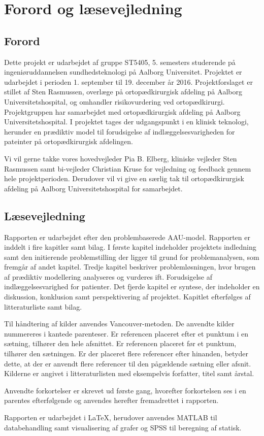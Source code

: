 \chapter*{Forord og læsevejledning}

\section*{Forord}
Dette projekt er udarbejdet af gruppe ST5405, 5. semesters studerende på ingeniøruddannelsen sundhedsteknologi på Aalborg Universitet. Projektet er udarbejdet i perioden 1. september til 19. december år 2016. Projektforslaget er stillet af Sten Rasmussen, overlæge på ortopædkirurgisk afdeling på Aalborg Universitetshospital, og omhandler risikovurdering ved ortopædkirurgi. Projektgruppen har samarbejdet med ortopædkirurgisk afdeling på Aalborg Universitetshospital. I projektet tages der udgangspunkt i en klinisk teknologi, herunder en prædiktiv model til forudsigelse af indlæggelsesvarigheden for pateinter på ortopædkirurgisk afdelingen. 


Vi vil gerne takke vores hovedvejleder Pia B. Elberg, kliniske vejleder Sten Rasmussen samt bi-vejleder Christian Kruse for vejledning og feedback gennem hele projektperioden. Derudover vil vi give en særlig tak til ortopædkirurgisk afdeling på Aalborg Universitetshospital for samarbejdet. 


\section*{Læsevejledning}
Rapporten er udarbejdet efter den problembaserede AAU-model. Rapporten er inddelt i fire kapitler samt bilag. I første kapitel indeholder projektets indledning samt den initierende problemstilling der ligger til grund for problemanalysen, som fremgår af andet kapitel. Tredje kapitel beskriver problemløsningen, hvor brugen af prædiktiv modellering analyseres og vurderes ift. Forudsigelse af indlæggelsesvarighed for patienter. Det fjerde kapitel er syntese, der indeholder en diskussion, konklusion samt perspektivering af projektet. Kapitlet efterfølges af litteraturliste samt bilag. 


Til håndtering af kilder anvendes Vancouver-metoden. De anvendte kilder nummereres i kantede parenteser. Er referencen placeret efter et punktum i en sætning, tilhører den hele afsnittet. Er referencen placeret før et punktum, tilhører den sætningen. Er der placeret flere referencer efter hinanden, betyder dette, at der er anvendt flere referencer til den pågældende sætning eller afsnit. Kilderne er angivet i litteraturlisten med eksempelvis forfatter, titel samt årstal. 


Anvendte forkortelser er skrevet ud første gang, hvorefter forkortelsen ses i en parentes efterfølgende og anvendes herefter fremadrettet i rapporten. 


Rapporten er udarbejdet i \LaTeX, herudover anvendes MATLAB til databehandling samt visualisering af grafer og SPSS til beregning af statisk. 
